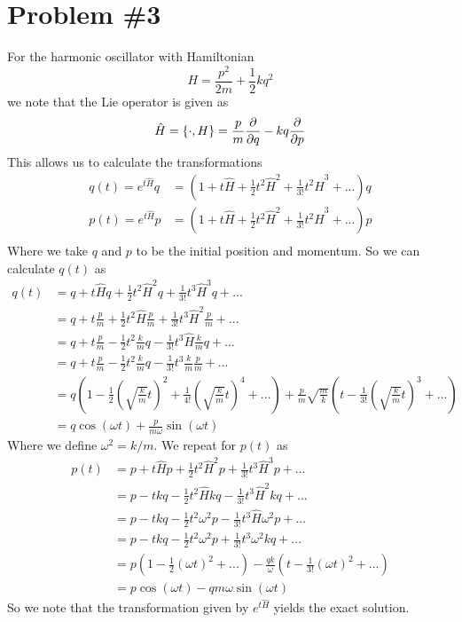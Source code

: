 \documentclass[11pt]{article}
\numberwithin{equation}{section}
\begin{document}
\pagebreak

\section{Problem \#3}
For the harmonic oscillator with Hamiltonian
$$H = \frac{p^2}{2m}+\frac{1}{2}kq^2$$
we note that the Lie operator is given as
$$\hat{H} = \{\cdot,H\} = \frac{p}{m}\frac{\partial{}}{\partial{q}} - kq\frac{\partial{}}{\partial{p}}$$
This allows us to calculate the transformations
\begin{align*}
q(t) = e^{t\hat{H}}q &= \left(1 + t\hat{H} + \frac{1}{2}t^2\hat{H}^2 + \frac{1}{3!}t^2\hat{H}^3 +...\right)q\\
p(t) = e^{t\hat{H}}p &= \left(1 + t\hat{H} + \frac{1}{2}t^2\hat{H}^2 + \frac{1}{3!}t^2\hat{H}^3 +...\right)p\\
\end{align*}
Where we take $q$ and $p$ to be the initial position and momentum. So we can calculate $q(t)$
as
\begin{align*}
q(t) &= q + t\hat{H}q + \frac{1}{2}t^2\hat{H}^2q + \frac{1}{3!}t^3\hat{H}^3q +...\\
&= q + t\frac{p}{m} + \frac{1}{2}t^2\hat{H}\frac{p}{m} + \frac{1}{3!}t^3\hat{H}^2\frac{p}{m} +...\\
&= q + t\frac{p}{m} - \frac{1}{2}t^2\frac{k}{m}q - \frac{1}{3!}t^3\hat{H}\frac{k}{m}q +...\\
&= q + t\frac{p}{m} - \frac{1}{2}t^2\frac{k}{m}q - \frac{1}{3!}t^3\frac{k}{m}\frac{p}{m} +...\\
&= q\left(1 - \frac{1}{2}\left(\sqrt{\frac{k}{m}}t\right)^2 + \frac{1}{4!}\left(\sqrt{\frac{k}{m}}t\right)^4 + ...\right) + \frac{p}{m}\sqrt{\frac{m}{k}}\left(t - \frac{1}{3!}\left(\sqrt{\frac{k}{m}}t\right)^3+...\right)\\
&= q\cos(\omega{t}) + \frac{p}{m\omega}\sin(\omega{t})
\end{align*}
Where we define $\omega^2=k/m$. We repeat for $p(t)$ as
\begin{align*}
p(t) &= p + t\hat{H}p + \frac{1}{2}t^2\hat{H}^2p + \frac{1}{3!}t^3\hat{H}^3p +...\\
&= p - tkq - \frac{1}{2}t^2\hat{H}kq - \frac{1}{3!}t^3\hat{H}^2kq +...\\
&= p - tkq - \frac{1}{2}t^2\omega^2p - \frac{1}{3!}t^3\hat{H}\omega^2p +...\\
&= p - tkq - \frac{1}{2}t^2\omega^2p + \frac{1}{3!}t^3\omega^2kq +...\\
&=p\left(1-\frac{1}{2}(\omega{t})^2+...\right) - \frac{qk}{\omega}\left(t-\frac{1}{3!}(\omega{t})^2+...\right)\\
&=p\cos(\omega{t}) - qm\omega\sin(\omega{t})
\end{align*}
So we note that the transformation given by $e^{t\hat{H}}$ yields the exact solution.
\end{document}
